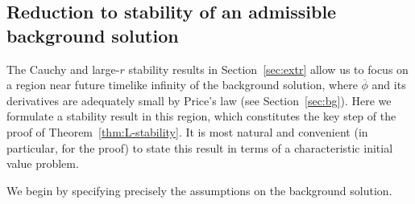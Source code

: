 \documentclass[10pt, reqno]{amsart}
\theoremstyle{definition}
\theoremstyle{remark}
\theoremstyle{conjecture}
\numberwithin{equation}{section}
\newcommand{\0}{\emptyset}
\newcommand{\phibg}{\overline{\phi}}				%
\begin{document}
\subsection{Reduction to stability of an admissible background solution} \label{subsec:main-st}
The Cauchy and large-$r$ stability results in Section~\ref{sec:extr} allow us to focus on a region near future timelike infinity of the background solution, where $\phibg$ and its derivatives are adequately small by Price's law (see Section~\ref{sec:bg}). Here we formulate a stability result in this region, which constitutes the key step of the proof of Theorem~\ref{thm:L-stability}. It is most natural and convenient (in particular, for the proof) to state this result in terms of a characteristic initial value problem.

We begin by specifying precisely the assumptions on the background solution.
\end{document}
